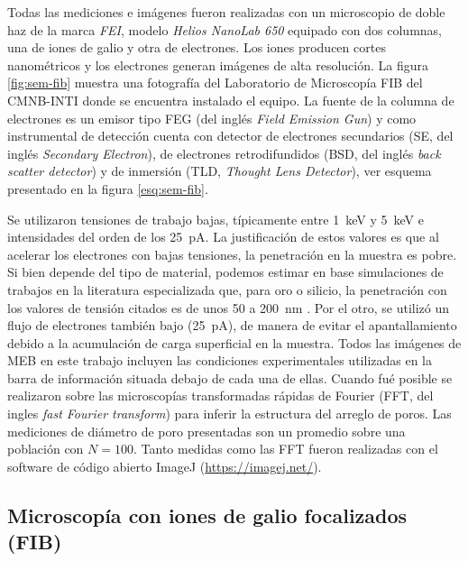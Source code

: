 		Todas las mediciones e imágenes fueron realizadas con un microscopio de doble haz de la marca \textit{FEI}, modelo \textit{Helios NanoLab 650} equipado con dos columnas, una de iones de galio y otra de electrones. Los iones producen cortes nanométricos y los electrones generan imágenes de alta resolución. La figura \ref{fig:sem-fib} muestra una fotografía del Laboratorio de Microscopía FIB del CMNB-INTI donde se encuentra instalado el equipo. La fuente de la columna de electrones es un emisor tipo FEG (del inglés \textit{Field Emission Gun}) y como instrumental de detección cuenta con detector de electrones secundarios (SE, del inglés \textit{Secondary Electron}), de electrones retrodifundidos (BSD, del inglés \textit{back scatter detector}) y de inmersión (TLD, \textit{Thought Lens Detector}), ver esquema presentado en la figura \ref{esq:sem-fib}. 

		Se utilizaron tensiones de trabajo bajas, típicamente entre \SI{1}{\kilo\electronvolt} y \SI{5}{\kilo\electronvolt} e intensidades del orden de los \SI{25}{\pA}. La justificación de estos valores es que al acelerar los electrones con bajas tensiones, la penetración en la muestra es pobre. Si bien depende del tipo de material, podemos estimar en base simulaciones de trabajos en la literatura especializada que, para oro o silicio, la penetración con los valores de tensión citados es de unos 50 a \SI{200}{\nm} \cite{Joy1984,Shur2012,Hafner2007}. Por el otro, se utilizó un flujo de electrones también bajo (\SI{25}{\pA}), de manera de evitar el apantallamiento debido a la acumulación de carga superficial en la muestra. Todos las imágenes de MEB en este trabajo incluyen las condiciones experimentales utilizadas en la barra de información situada debajo de cada una de ellas. Cuando fué posible se realizaron sobre las microscopías transformadas rápidas de Fourier (FFT, del ingles \textit{fast Fourier transform}) para inferir la estructura del arreglo de poros. Las mediciones de diámetro de poro presentadas son un promedio sobre una población con $N=100$. Tanto  medidas como las FFT fueron realizadas con el software de código abierto ImageJ (\url{https://imagej.net/})\cite{ImageJ2012}.	

					
	\subsection{Microscopía con iones de galio focalizados (FIB)}\label{sec:FIB}

